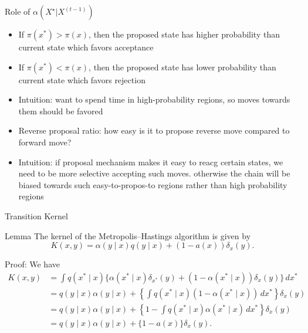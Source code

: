 \begin{frame}{Role of $\alpha(X^{\star} | X^{(t-1)})$}
	\begin{itemize}
		\item If $\pi(x^*) > \pi(x)$, then the proposed state has higher probability than current state which favors acceptance
		\item If $\pi(x^*) < \pi(x)$, then the proposed state has lower probability than current state which favors rejection
		\item Intuition: want to spend time in high-probability regions, so moves towards them should be favored
		\item Reverse proposal ratio: how easy is it to propose reverse move compared to forward move?
		\item Intuition: if proposal mechanism makes it easy to reacg certain states,
		      we need to be more selective accepting such moves. otherwise the chain will be
		      biased towards such easy-to-propos-to regions rather than high probability regions
	\end{itemize}
\end{frame}

\begin{frame}{Transition Kernel}
	\begin{block}{Lemma}
		The kernel of the Metropolis--Hastings algorithm is given by
		\[
			K(x, y) = \alpha(y \mid x)q(y \mid x) + (1 - a(x))\delta_x(y).
		\]
	\end{block}

	Proof:
	We have
	\begin{align*}
		K(x,y)
		 & = \int q(x^* \mid x)\{\alpha(x^* \mid x)\delta_{x^*}(y) + (1 - \alpha(x^* \mid x))\delta_x(y)\}\,dx^*      \\
		 & = q(y \mid x)\alpha(y \mid x) + \left\{\int q(x^* \mid x)(1 - \alpha(x^* \mid x))\,dx^*\right\}\delta_x(y) \\
		 & = q(y \mid x)\alpha(y \mid x) + \left\{1 - \int q(x^* \mid x)\alpha(x^* \mid x)\,dx^*\right\}\delta_x(y)   \\
		 & = q(y \mid x)\alpha(y \mid x) + \{1 - a(x)\}\delta_x(y).
	\end{align*}

\end{frame}

